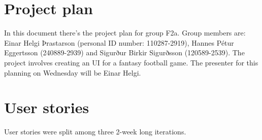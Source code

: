\documentclass{article}
\begin{document}
\section{Project plan}
In this document there's the project plan for group F2a. Group members are: Einar Helgi Þrastarson (personal ID number: 110287-2919), Hannes Pétur Eggertsson (240889-2939) and Sigurður Birkir Sigurðsson (120589-2539). The project involves creating an UI for a fantasy football game. The presenter for this planning on Wednesday will be Einar Helgi.

\section{User stories}
User stories were split among three 2-week long iterations.
\end{document}
